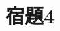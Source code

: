 \documentclass[class=jsarticle, crop=false, dvipdfmx, fleqn]{standalone}
\begin{document}
\section*{宿題4}
\end{document}
